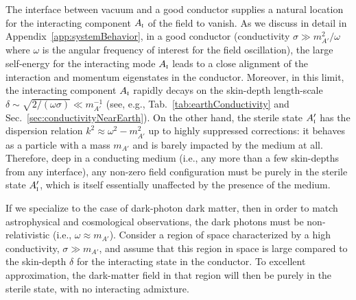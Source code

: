 \documentclass[amsmath,amssymb,aps,10pt,prd,letterpaper,nofootinbib,balancelastpage,notitlepage,superscriptaddress,twocolumn,floatfix]{revtex4-2}
\newcommand{\tabref}[2][]{Tab{#1}.~\ref{#2}}		%
\newcommand{\secref}[2][]{Sec{#1}.~\ref{#2}}		%
\newcommand{\appref}[2][x]{Appendi{#1}~\ref{#2}}	%
\newcommand{\tsc}[1]{\textsc{#1}}
\begin{document}
The interface between vacuum and a good conductor supplies a natural location for the interacting component $A_{\tsc{i}}$ of the field to vanish.
As we discuss in detail in \appref{app:systemBehavior}, in a good conductor (conductivity $\sigma \gg m_{A'}^2/\omega$ where $\omega$ is the angular frequency of interest for the field oscillation), the large self-energy for the interacting mode $A_{\tsc{i}}$ leads to a close alignment of the interaction and momentum eigenstates in the conductor. 
Moreover, in this limit, the interacting component $A_{\tsc{i}}$ rapidly decays on the skin-depth length-scale $\delta \sim \sqrt{2/(\omega \sigma)} \ll m_{A'}^{-1}$ (see, e.g., \tabref{tab:earthConductivity} and \secref{sec:conductivityNearEarth}).
On the other hand, the sterile state $A_{\tsc{i}}'$ has the dispersion relation $k^2 \approx \omega^2 - m_{A'}^2$ up to highly suppressed corrections: it behaves as a particle with a mass $m_{A'}$ and is barely impacted by the medium at all.
Therefore, deep in a conducting medium (i.e., any more than a few skin-depths from any interface), any non-zero field configuration must be purely in the sterile state $A_{\tsc{i}}'$, which is itself essentially unaffected by the presence of the medium.

If we specialize to the case of dark-photon dark matter, then in order to match astrophysical and cosmological observations, the dark photons must be non-relativistic (i.e., $\omega\approx m_{A'}$).
Consider a region of space characterized by a high conductivity, $\sigma \gg m_{A'}$, and assume that this region in space is large compared to the skin-depth $\delta$ for the interacting state in the conductor. 
To excellent approximation, the dark-matter field in that region will then be purely in the sterile state, with no interacting admixture.
\end{document}
